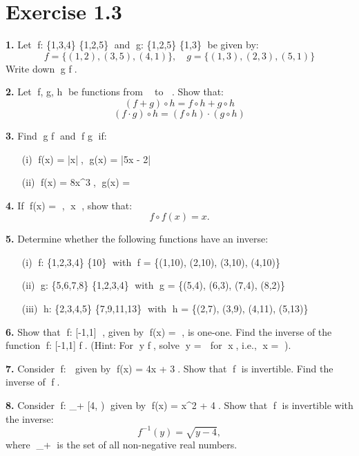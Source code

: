 \documentclass{article}
\begin{document}
\section*{Exercise 1.3}

\textbf{1.} Let f: \{1,3,4\} \to \{1,2,5\} and g: \{1,2,5\} \to \{1,3\} be given by:
\[
f = \{(1,2), (3,5), (4,1)\}, \quad g = \{(1,3), (2,3), (5,1)\}
\]
Write down g \circ f.

\textbf{2.} Let f, g, h be functions from  to . Show that:
\[
(f + g) \circ h = f \circ h + g \circ h
\]
\[
(f \cdot g) \circ h = (f \circ h) \cdot (g \circ h)
\]

\textbf{3.} Find g \circ f and f \circ g if:
\begin{itemize}
    \item[(i)] f(x) = |x|, g(x) = |5x - 2|
    \item[(ii)] f(x) = 8x^3, g(x) = 
\end{itemize}

\textbf{4.} If f(x) = , x \neq {}, show that:
\[
f \circ f (x) = x.
\]

\textbf{5.} Determine whether the following functions have an inverse:
\begin{itemize}
    \item[(i)] f: \{1,2,3,4\} \to \{10\} with f = \{(1,10), (2,10), (3,10), (4,10)\}
    \item[(ii)] g: \{5,6,7,8\} \to \{1,2,3,4\} with g = \{(5,4), (6,3), (7,4), (8,2)\}
    \item[(iii)] h: \{2,3,4,5\} \to \{7,9,11,13\} with h = \{(2,7), (3,9), (4,11), (5,13)\}
\end{itemize}

\textbf{6.} Show that f: [-1,1] \to {}, given by f(x) = , is one-one. Find the inverse of the function f: [-1,1] \to {} f.  
(Hint: For y \in {} f, solve y =  for x, i.e., x = ).

\textbf{7.} Consider f:  \to {} given by f(x) = 4x + 3. Show that f is invertible. Find the inverse of f.

\textbf{8.} Consider f: _+ \to [4, \infty) given by f(x) = x^2 + 4. Show that f is invertible with the inverse:
\[
f^{-1}(y) = \sqrt{y-4},
\]
where _+ is the set of all non-negative real numbers.

\newpage
\end{document}
